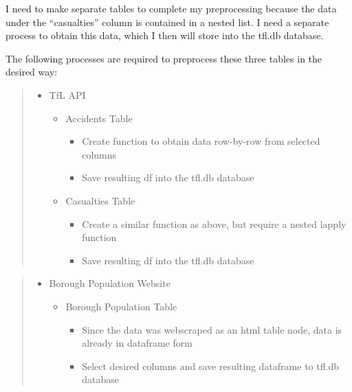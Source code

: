 \documentclass[
]{article}
\providecommand{\tightlist}{%
  \setlength{\itemsep}{0pt}\setlength{\parskip}{0pt}}
\begin{document}
I need to make separate tables to complete my preprocessing because the
data under the ``casualties'' column is contained in a nested list. I
need a separate process to obtain this data, which I then will store
into the tfl.db database.

The following processes are required to preprocess these three tables in
the desired way:

\begin{quote}
\begin{itemize}
\tightlist
\item
  TfL API

  \begin{itemize}
  \tightlist
  \item
    Accidents Table

    \begin{itemize}
    \tightlist
    \item
      Create function to obtain data row-by-row from selected columns
    \item
      Save resulting df into the tfl.db database
    \end{itemize}
  \item
    Casualties Table

    \begin{itemize}
    \tightlist
    \item
      Create a similar function as above, but require a nested lapply
      function
    \item
      Save resulting df into the tfl.db database
    \end{itemize}
  \end{itemize}
\end{itemize}
\end{quote}

\begin{quote}
\begin{itemize}
\tightlist
\item
  Borough Population Website

  \begin{itemize}
  \tightlist
  \item
    Borough Population Table

    \begin{itemize}
    \tightlist
    \item
      Since the data was webscraped as an html table node, data is
      already in dataframe form
    \item
      Select desired columns and save resulting dataframe to tfl.db
      database
    \end{itemize}
  \end{itemize}
\end{itemize}
\end{quote}
\end{document}
